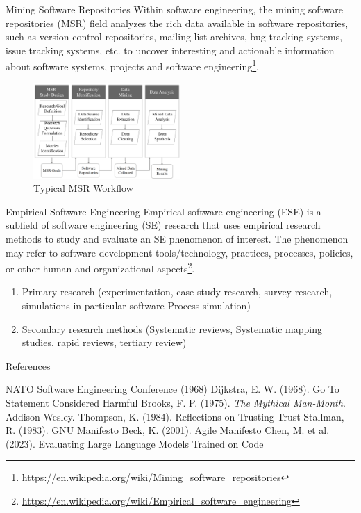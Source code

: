 \documentclass{beamer}
\begin{document}
\begin{frame}[t]{Mining Software Repositories}
Within software engineering, the mining software repositories (MSR) field analyzes the rich data available in software repositories, such as version control repositories, mailing list archives, bug tracking systems, issue tracking systems, etc. to uncover interesting and actionable information about software systems, projects and software engineering\footnote{\url{https://en.wikipedia.org/wiki/Mining_software_repositories}}.

    \begin{figure}
    \begin{center}
        \includegraphics[width=0.5\textwidth]{images/msr.png}
    \end{center}
    \caption{Typical MSR Workflow}
    \end{figure}
\end{frame}

\begin{frame}[t]{Empirical Software Engineering}
Empirical software engineering (ESE) is a subfield of software engineering (SE) research that uses empirical research methods to study and evaluate an SE phenomenon of interest. The phenomenon may refer to software development tools/technology, practices, processes, policies, or other human and organizational aspects\footnote{\url{https://en.wikipedia.org/wiki/Empirical_software_engineering}}. %

\begin{enumerate}
    \item Primary research (experimentation, case study research, survey research, simulations in particular software Process simulation)
    \item Secondary research methods (Systematic reviews, Systematic mapping studies, rapid reviews, tertiary review)
\end{enumerate}
\end{frame}
\begin{frame}[t]{References}
\begin{thebibliography}{10}
 NATO Software Engineering Conference (1968)
 Dijkstra, E. W. (1968). Go To Statement Considered Harmful
 Brooks, F. P. (1975). \textit{The Mythical Man-Month}. Addison-Wesley. %
 Thompson, K. (1984). Reflections on Trusting Trust
 Stallman, R. (1983). GNU Manifesto
 Beck, K. (2001). Agile Manifesto
 Chen, M. et al. (2023). Evaluating Large Language Models Trained on Code
\end{thebibliography}
\end{frame}
\end{document}
